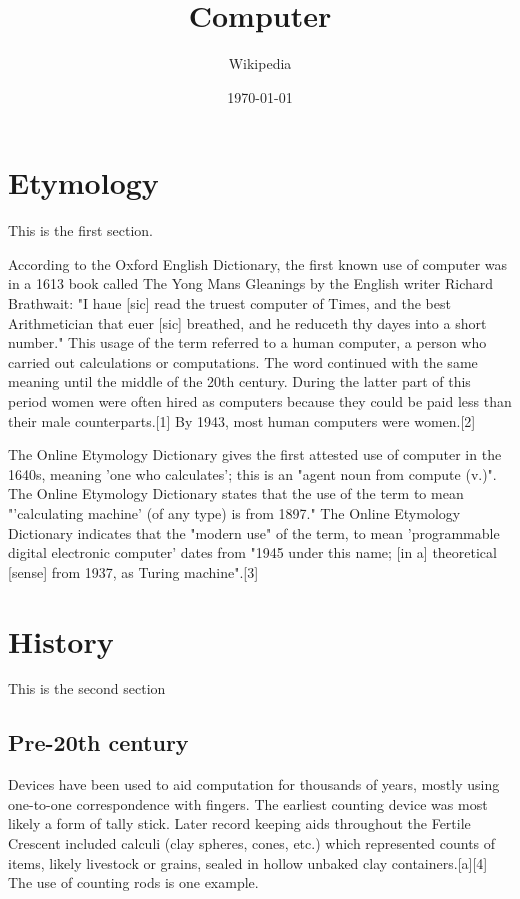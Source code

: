\documentclass{article}
\title{Computer}
\author{Wikipedia}
\date{\today}
\begin{document}
\maketitle
\newpage
\section{Etymology}

This is the first section.

According to the Oxford English Dictionary, the first known use of computer was in a 1613 book called The Yong Mans Gleanings by the English writer Richard Brathwait: "I haue [sic] read the truest computer of Times, and the best Arithmetician that euer [sic] breathed, and he reduceth thy dayes into a short number." This usage of the term referred to a human computer, a person who carried out calculations or computations. The word continued with the same meaning until the middle of the 20th century. During the latter part of this period women were often hired as computers because they could be paid less than their male counterparts.[1] By 1943, most human computers were women.[2]

The Online Etymology Dictionary gives the first attested use of computer in the 1640s, meaning 'one who calculates'; this is an "agent noun from compute (v.)". The Online Etymology Dictionary states that the use of the term to mean "'calculating machine' (of any type) is from 1897." The Online Etymology Dictionary indicates that the "modern use" of the term, to mean 'programmable digital electronic computer' dates from "1945 under this name; [in a] theoretical [sense] from 1937, as Turing machine".[3]

\section{History}
This is the second section

\subsection{Pre-20th century}

Devices have been used to aid computation for thousands of years, mostly using one-to-one correspondence with fingers. The earliest counting device was most likely a form of tally stick. Later record keeping aids throughout the Fertile Crescent included calculi (clay spheres, cones, etc.) which represented counts of items, likely livestock or grains, sealed in hollow unbaked clay containers.[a][4] The use of counting rods is one example.
\end{document}

